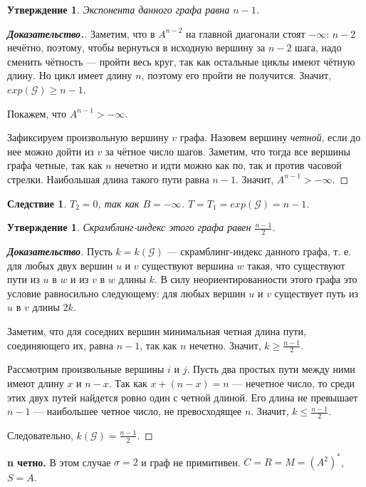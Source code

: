 \documentclass[12pt]{article}
\newtheorem{proposition}[theorem]{Утверждение}
\newtheorem{corollary}[theorem]{Следствие}
\begin{document}
\begin{proposition}
Экспонента данного графа равна $n - 1$.
\end{proposition}
\begin{proof}[\textbf{Доказательство.}]
Заметим, что в $A^{n - 2}$ на главной диагонали стоят $-\infty$: $n - 2$ нечётно, поэтому, чтобы вернуться в исходную вершину за $n - 2$ шага, надо сменить чётность --- пройти весь круг, так как остальные циклы имеют чётную длину. Но цикл имеет длину $n$, поэтому его пройти не получится. Значит, $exp(\mathcal{G}) \ge n - 1$.

Покажем, что $A^{n - 1} > -\infty$.

Зафиксируем произвольную вершину $v$ графа. Назовем вершину \textit{четной}, если до нее можно дойти из $v$ за чётное число шагов. Заметим, что тогда все вершины графа четные, так как $n$ нечетно и идти можно как по, так и против часовой стрелки. Наибольшая длина такого пути равна $n - 1$. Значит, $A^{n - 1} > -\infty$.
\end{proof}
\begin{corollary}
$T_2 = 0$, так как $B = -\infty$. $T = T_1 = exp(\mathcal{G}) = n - 1$.
\end{corollary}
\begin{proposition}
Скрамблинг-индекс этого графа равен $\frac{n - 1}{2}$.
\end{proposition}
\begin{proof}[\textbf{Доказательство}]
Пусть $k = k(\mathcal{G})$ --- скрамблинг-индекс данного графа, т. е. для любых двух вершин $u$ и $v$ существуют вершина $w$ такая, что существуют пути из $u$ в $w$ и из $v$ в $w$ длины $k$. В силу неориентированности этого графа это условие равносильно следующему: для любых вершин $u$ и $v$ существует путь из $u$ в $v$ длины $2k$.

Заметим, что для соседних вершин минимальная четная длина пути, соединяющего их, равна $n - 1$, так как $n$ нечетно. Значит, $k \ge \frac{n - 1}{2}$.

Рассмотрим произвольные вершины $i$ и $j$. Пусть два простых пути между ними имеют длину $x$ и $n - x$. Так как $x + (n - x) = n$ --- нечетное число, то среди этих двух путей найдется ровно один с четной длиной. Его длина не превышает $n - 1$ --- наибольшее четное число, не превосходящее $n$. Значит, $k \le \frac{n - 1}{2}$.

Следовательно, $k(\mathcal{G}) = \frac{n - 1}{2}$.
\end{proof}

\textbf{n четно.} В этом случае $\sigma = 2$ и граф не примитивен. $C = R = M = (A^2)^*$, $S = A$.
\end{document}
